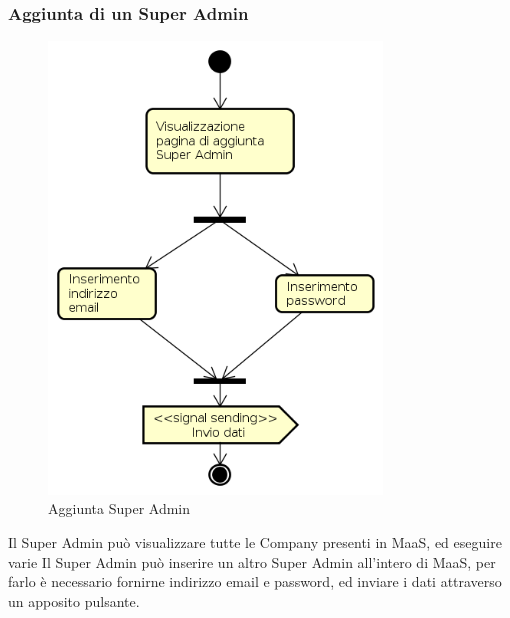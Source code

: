 \subsubsection{Aggiunta di un Super Admin}
\begin{figure}[H]
\begin{center}
\includegraphics[height=12cm]{res/sections/backend/activities/aggiuntaSuperAdmin.png}
\caption{Aggiunta Super Admin}
\end{center}
\end{figure}
Il Super Admin può visualizzare tutte le Company presenti in MaaS, ed eseguire varie Il Super Admin può inserire un altro Super Admin all'intero di MaaS, per farlo è necessario fornirne indirizzo email e password, ed inviare i dati attraverso un apposito pulsante.
